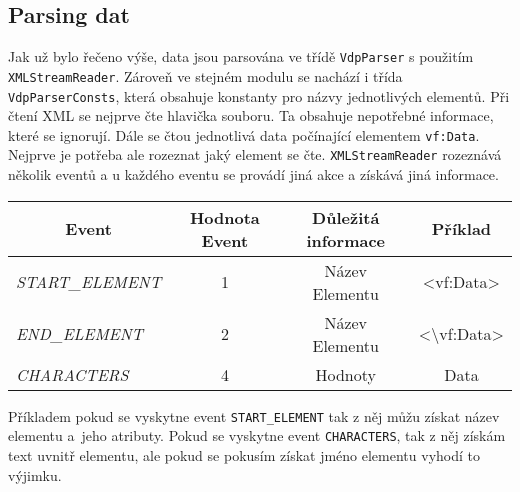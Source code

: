 \subsection{Parsing dat}
Jak už bylo řečeno výše, data jsou parsována ve třídě \texttt{VdpParser} s použitím \\ \texttt{XMLStreamReader}.
Zároveň ve stejném modulu se nachází i třída \texttt{VdpParserConsts}, která obsahuje konstanty pro názvy jednotlivých elementů.
Při čtení XML se nejprve čte hlavička souboru. Ta obsahuje nepotřebné informace, které se ignorují.
Dále se čtou jednotlivá data počínající elementem \texttt{vf:Data}.
Nejprve je potřeba ale rozeznat jaký element se čte.
\texttt{XMLStreamReader} rozeznává několik eventů a u každého eventu se provádí jiná akce a získává jiná informace.
\begin{table}[!h]
    \begin{tabular}{|l|c|c|c|}
    \hline
    \multicolumn{1}{|c|}{\textbf{Event}} & \textbf{Hodnota Event} & \textbf{Důležitá informace} & \textbf{Příklad}                                 \\ \hline
    \textit{START\_ELEMENT}              & 1                      & Název Elementu              & \textless{}vf:Data\textgreater{}                 \\ \hline
    \textit{END\_ELEMENT}                & 2                      & Název Elementu              & \textless{}\textbackslash{}vf:Data\textgreater{} \\ \hline
    \textit{CHARACTERS}                  & 4                      & Hodnoty                     & Data                                             \\ \hline
    \end{tabular}
\end{table}

Příkladem pokud se vyskytne event \texttt{START\_ELEMENT} tak z něj můžu získat název elementu a~jeho atributy.
Pokud se vyskytne event \texttt{CHARACTERS}, tak z něj získám text uvnitř elementu, ale pokud se pokusím získat jméno elementu vyhodí to výjimku.

